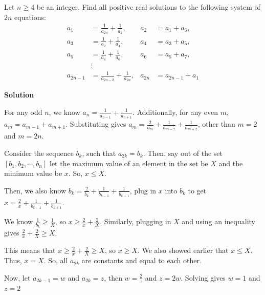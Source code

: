 \begin{enumerate}
 Let $n \geq 4$ be an integer. Find all positive real solutions to the following system of $2n$ equations: 
 \begin{align*} a_{1} &=\frac{1}{a_{2 n}}+\frac{1}{a_{2}}, & a_{2}&=a_{1}+a_{3}, \\ a_{3}&=\frac{1}{a_{2}}+\frac{1}{a_{4}}, & a_{4}&=a_{3}+a_{5}, \\ a_{5}&=\frac{1}{a_{4}}+\frac{1}{a_{6}}, & a_{6}&=a_{5}+a_{7}, \\ &\vdots \\ a_{2 n-1}&=\frac{1}{a_{2 n-2}}+\frac{1}{a_{2 n}}, & a_{2 n}&=a_{2 n-1}+a_{1} \end{align*}





\textbf{Solution}

For any odd $n$, we know $a_n = \frac{1}{a_{n-1}} + \frac{1}{a_{n+1}}$. Additionally, for any even $m$, $a_m = a_{m-1} + a_{m+1}$. Substituting gives $a_m = \frac{2}{a_m} + \frac{1}{a_{m-2}} + \frac{1}{a_{m+2}}$, other than $m=2$ and $m=2n$.

 Consider the sequence $b_k$, such that $a_{2k} = b_k$. Then, say out of the set $[b_1, b_2, \cdots, b_n]$ let the maximum value of an element in the set be $X$ and the minimum value be $x$. So, $x \le X$.

 Then, we also know $b_k = \frac{2}{b_k} + \frac{1}{b_{k-1}} + \frac{1}{b_{k+1}}$, plug in $x$ into $b_k$ to get $x = \frac{2}{x} + \frac{1}{b_{k-1}} + \frac{1}{b_{k+1}}$.

 We know $\frac{1}{b_k} \ge \frac{1}{X}$, so $x \ge \frac{2}{x} + \frac{2}{X}$. Similarly, plugging in $X$ and using an inequality gives $\frac{2}{x} + \frac{2}{X} \ge X$.

 This means that $x \ge \frac{2}{x} + \frac{2}{X} \ge X$, so $x \ge X$. We also showed earlier that $x \le X$. Thus, $x = X$. So, all $a_{2k}$ are constants and equal to each other. 

 Now, let $a_{2k-1}=w$ and $a_{2k}=z$, then $w = \frac{2}{z}$ and $z=2w$. Solving gives $w=1$ and $z=2$



\end{enumerate}